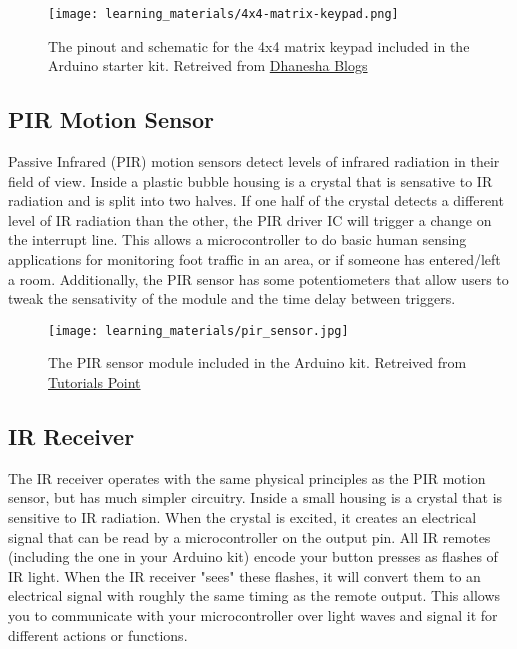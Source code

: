     \begin{figure}[h!]
        \texttt{[image: learning\_materials/4x4-matrix-keypad.png]}
        \caption[4x4 Matrix Keypad]{The pinout and schematic for the 4x4 matrix keypad included in the Arduino starter kit. 
        Retreived from \href{https://dhaneshablogs.blogspot.com/2019/08/interfacing-4x4-matrix-keypad-with.html}
        {Dhanesha Blogs}}
    \end{figure}

    \subsection*{PIR Motion Sensor}
    Passive Infrared (PIR) motion sensors detect levels of infrared radiation in their field of view.
    Inside a plastic bubble housing is a crystal that is sensative to IR radiation and is split into two halves.
    If one half of the crystal detects a different level of IR radiation than the other, the PIR driver IC will trigger a change on the interrupt line.
    This allows a microcontroller to do basic human sensing applications for monitoring foot traffic in an area, or if someone has entered/left a room.
    Additionally, the PIR sensor has some potentiometers that allow users to tweak the sensativity of the module and the time delay between triggers.

    \begin{figure}[h!]
        \texttt{[image: learning\_materials/pir\_sensor.jpg]}
        \caption[PIR Sensor]{The PIR sensor module included in the Arduino kit. 
        Retreived from \href{https://www.tutorialspoint.com/arduino/arduino_pir_sensor.htm}
        {Tutorials Point}}
    \end{figure}

    \subsection*{IR Receiver}
    The IR receiver operates with the same physical principles as the PIR motion sensor, but has much simpler circuitry.
    Inside a small housing is a crystal that is sensitive to IR radiation.
    When the crystal is excited, it creates an electrical signal that can be read by a microcontroller on the output pin.
    All IR remotes (including the one in your Arduino kit) encode your button presses as flashes of IR light.
    When the IR receiver "sees" these flashes, it will convert them to an electrical signal with roughly the same timing as the remote output.
    This allows you to communicate with your microcontroller over light waves and signal it for different actions or functions.

